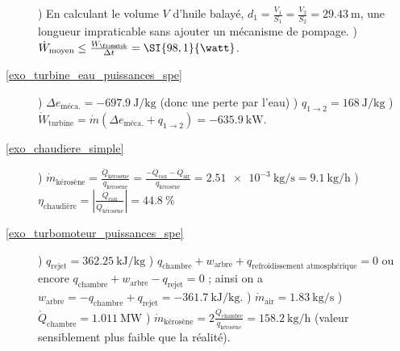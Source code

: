 \begin{description}
					) En calculant le volume $V$ d’huile balayé, $d_1 = \frac{V_1}{S_1} = \frac{V_2}{S_2} = \SI{29,43}{\metre}$, une longueur impraticable sans ajouter un mécanisme de pompage.
					) $\dot W_{\text{moyen}} \leq \frac{W_\fromatob}{\Delta t} = \SI{98,1}{\watt}$.
		\item [\ref{exo_turbine_eau_puissances_spe}]
					) $\Delta e_{\text{méca.}} = \SI{-697,9}{\joule\per\kilogram}$ (donc une perte par l’eau)
					) $q_{1 \to 2} = \SI{+168}{\joule\per\kilogram}$
					) $\dot W_{\text{turbine}} = \dot m (\Delta e_{\text{méca.}} + q_{1 \to 2} ) = \SI{-635,9}{\kilo\watt}$.
		\item [\ref{exo_chaudiere_simple}] 	
					) $\dot m_{\text{kérosène}} = \frac{\dot Q_{\text{kérosène}}}{q_{\text{kérosène}}} = \frac{-\dot Q_{\text{eau}} - \dot Q_{\text{air}}}{q_{\text{kérosène}}} =  \SI{2,51e-3}{\kilogram\per\second} = \SI{9,1}{\kilogram\per\hour}	$
					) $\eta_{\text{chaudière}} = \left|\frac{\dot Q_{\text{eau}}}{\dot Q_{\text{kérosène}}}\right| = \SI{44,8}{\percent}$
		\item [\ref{exo_turbomoteur_puissances_spe}]
					) $q_{\text{rejet}} = \SI{+362,25}{\kilo\joule\per\kilogram}$
					) $q_{\text{chambre}} + w_{\text{arbre}} + q_{\text{refroidissement atmosphérique}} = 0$ ou encore $q_{\text{chambre}} + w_{\text{arbre}} - q_{\text{rejet}} = 0$ ; ainsi on a $w_{\text{arbre}} = - q_{\text{chambre}} + q_{\text{rejet}} = \SI{-361,7}{\kilo\joule\per\kilogram}$.
					) $\dot m_{\text{air}} = \SI{1,83}{\kilogram\per\second}$
					) $\dot Q_{\text{chambre}} = \SI{1,011}{\mega\watt}$
					) $\dot m_{\text{kérosène}} = 2 \frac{\dot Q_{\text{chambre}}}{q_{\text{kérosène}}} = \SI{158,2}{\kilogram\per\hour}$ (valeur sensiblement plus faible que la réalité).
	\end{description}


